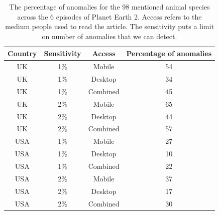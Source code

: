 \documentclass[12pt,letterpaper]{article}
\begin{document}
\begin{table}
\centering
\caption {The percentage of anomalies for the 98 mentioned animal species across the 6 episodes of Planet Earth 2. Access refers to the medium people used to read the article. The sensitivity puts a limit on number of anomalies that we can detect.} \label{tab:anomalies} 
    \begin{tabular}{cccc} 
   \hline
    Country & Sensitivity & Access   & Percentage of anomalies \\ \hline
    UK      & 1\%         & Mobile   & 54                      \\
    UK      & 1\%         & Desktop  & 34                      \\
    UK      & 1\%         & Combined & 45                      \\
    UK      & 2\%         & Mobile   & 65                      \\
    UK      & 2\%         & Desktop  & 44                      \\
    UK      & 2\%         & Combined & 57                      \\ \hdashline
    USA     & 1\%         & Mobile   & 27                      \\ 
    USA     & 1\%         & Desktop  & 10                      \\
    USA     & 1\%         & Combined & 22                      \\
    USA     & 2\%         & Mobile   & 37                      \\
    USA     & 2\%         & Desktop  & 17                      \\
    USA     & 2\%         & Combined & 30                      \\ \hline
    \end{tabular}
\end{table}
\end{document}
